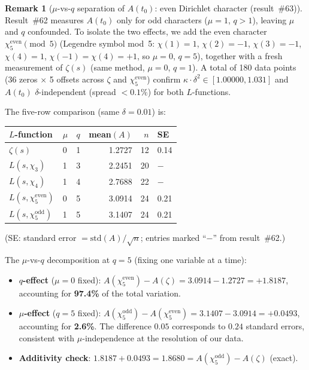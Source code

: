 \documentclass[11pt, a4paper]{article}
\theoremstyle{definition}
\newtheorem{remark}{Remark}[section]
\theoremstyle{plain}
\begin{document}
\begin{remark}[$\mu$-vs-$q$ separation of $A(t_0)$: even Dirichlet character (result~\#63)]
\label{rem:dirichlet_mu_q_separation}
Result~\#62 measures $A(t_0)$ only for odd characters ($\mu = 1$, $q > 1$),
leaving $\mu$ and $q$ confounded.
To isolate the two effects, we add the even character
$\chi_5^{\mathrm{even}} \pmod{5}$ (Legendre symbol mod~5:
$\chi(1){=}1$, $\chi(2){=}{-1}$, $\chi(3){=}{-1}$, $\chi(4){=}1$,
$\chi({-1}){=}\chi(4){=}+1$, so $\mu = 0$, $q = 5$),
together with a fresh measurement of $\zeta(s)$ (same method, $\mu = 0$, $q = 1$).
A total of 180 data points (36 zeros $\times$ 5 offsets across
$\zeta$ and $\chi_5^{\mathrm{even}}$) confirm $\kappa{\cdot}\delta^2 \in [1.00000, 1.031]$
and $A(t_0)$ $\delta$-independent (spread ${<}0.1\%$) for both $L$-functions.

The five-row comparison (same $\delta = 0.01$) is:
\smallskip
\begin{center}
\small
\begin{tabular}{@{}llcrrl@{}}
\toprule
$L$-function & $\mu$ & $q$ & mean$(A)$ & $n$ & SE \\
\midrule
$\zeta(s)$ & 0 & 1 & 1.2727 & 12 & 0.14 \\
$L(s,\chi_3)$ & 1 & 3 & 2.2451 & 20 & $-$ \\
$L(s,\chi_4)$ & 1 & 4 & 2.7688 & 22 & $-$ \\
$L(s,\chi_5^{\mathrm{even}})$ & 0 & 5 & 3.0914 & 24 & 0.21 \\
$L(s,\chi_5^{\mathrm{odd}})$ & 1 & 5 & 3.1407 & 24 & 0.21 \\
\bottomrule
\end{tabular}
\end{center}
\smallskip\noindent
(SE: standard error $= \mathrm{std}(A)/\sqrt{n}$; entries marked ``$-$'' from result~\#62.)

\noindent The $\mu$-vs-$q$ decomposition at $q = 5$ (fixing one variable at a time):
\begin{itemize}
  \item \textbf{$q$-effect} ($\mu = 0$ fixed):
        $A(\chi_5^{\mathrm{even}}) - A(\zeta) = 3.0914 - 1.2727 = +1.8187$,
        accounting for \textbf{97.4\%} of the total variation.
  \item \textbf{$\mu$-effect} ($q = 5$ fixed):
        $A(\chi_5^{\mathrm{odd}}) - A(\chi_5^{\mathrm{even}}) = 3.1407 - 3.0914 = +0.0493$,
        accounting for \textbf{2.6\%}.  The difference $0.05$ corresponds to
        $0.24$ standard errors, consistent with $\mu$-independence at the
        resolution of our data.
  \item \textbf{Additivity check}:
        $1.8187 + 0.0493 = 1.8680 = A(\chi_5^{\mathrm{odd}}) - A(\zeta)$ (exact).
\end{itemize}


\end{remark}
\end{document}
